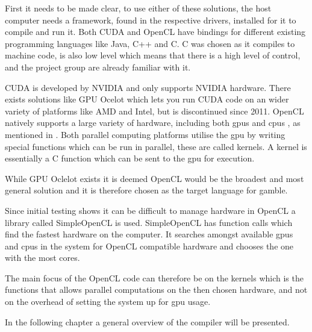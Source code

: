 First it needs to be made clear, to use either of these solutions, the host computer needs a framework, found in the respective drivers, installed for it to compile and run it. 
Both CUDA and OpenCL have bindings for different existing programming languages like Java, C++ and C.
C was chosen as it compiles to machine code, is also low level which means that there is a high level of control, and the project group are already familiar with it. 

CUDA is developed by NVIDIA and only supports NVIDIA hardware.
There exists solutions like GPU Ocelot which lets you run CUDA code on an wider variety of platforms like AMD and Intel, but is discontinued since 2011. \citep{Diamos:2010:ODO:1854273.1854318}
OpenCL natively supports a large variety of hardware, including both \acrshort{gpu}s and \acrshort{cpu}s , as mentioned in .
Both parallel computing platforms utilise the \acrshort{gpu} by writing special functions which can be run in parallel, these are called kernels.
A kernel is essentially a C function which can be sent to the \acrshort{gpu} for execution.

While GPU Oclelot exists it is deemed OpenCL would be the broadest and most general solution and it is therefore chosen as the target language for \gls{gamble}.

Since initial testing shows it can be difficult to manage hardware in OpenCL a library called SimpleOpenCL is used.
SimpleOpenCL has function calls which find the fastest hardware on the computer.
It searches amongst available \acrshort{gpu}s and \acrshort{cpu}s in the system for OpenCL compatible hardware and chooses the one with the most cores. \citep{simpleCL}

The main focus of the OpenCL code can therefore be on the kernels which is the functions that allows parallel computations on the then chosen hardware, and not on the overhead of setting the system up for \acrshort{gpu} usage.

In the following chapter a general overview of the compiler will be presented.
